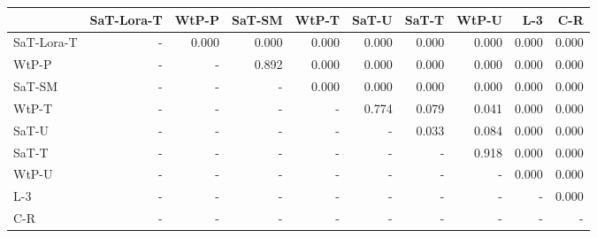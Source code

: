 \begin{tabular}{lrrrrrrrrr}
\toprule
 & SaT-Lora-T & WtP-P & SaT-SM & WtP-T & SaT-U & SaT-T & WtP-U & L-3 & C-R \\
\midrule
SaT-Lora-T & - & 0.000 & 0.000 & 0.000 & 0.000 & 0.000 & 0.000 & 0.000 & 0.000 \\
WtP-P & - & - & 0.892 & 0.000 & 0.000 & 0.000 & 0.000 & 0.000 & 0.000 \\
SaT-SM & - & - & - & 0.000 & 0.000 & 0.000 & 0.000 & 0.000 & 0.000 \\
WtP-T & - & - & - & - & 0.774 & 0.079 & 0.041 & 0.000 & 0.000 \\
SaT-U & - & - & - & - & - & 0.033 & 0.084 & 0.000 & 0.000 \\
SaT-T & - & - & - & - & - & - & 0.918 & 0.000 & 0.000 \\
WtP-U & - & - & - & - & - & - & - & 0.000 & 0.000 \\
L-3 & - & - & - & - & - & - & - & - & 0.000 \\
C-R & - & - & - & - & - & - & - & - & - \\
\bottomrule
\end{tabular}

